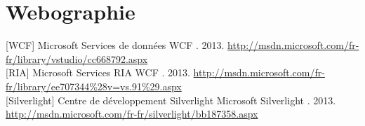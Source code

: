 \cleardoublepage

\chapter*{Webographie}

\thispagestyle{empty}



[WCF] Microsoft \og Services de données WCF \fg. 2013. \url{http://msdn.microsoft.com/fr-fr/library/vstudio/cc668792.aspx}
\\

[RIA] Microsoft \og Services RIA WCF \fg. 2013. \url{http://msdn.microsoft.com/fr-fr/library/ee707344\%28v=vs.91\%29.aspx}
\\

[Silverlight] Centre de développement Silverlight \og Microsoft Silverlight \fg. 2013. \url{http://msdn.microsoft.com/fr-fr/silverlight/bb187358.aspx}